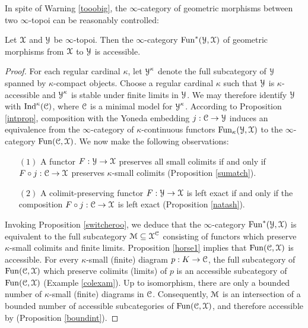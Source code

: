 In spite of Warning \ref{tooobig}, the $\infty$-category of geometric morphisms between two $\infty$-topoi can be reasonably controlled:

\begin{proposition}\label{nottoobig}
Let $\operatorname{\mathcal{X}}$ and $\operatorname{\mathcal{Y}}$ be $\infty$-topoi. Then the
$\infty$-category $\operatorname{Fun}^{\ast}(\operatorname{\mathcal{Y}}, \operatorname{\mathcal{X}})$ of geometric morphisms from
$\operatorname{\mathcal{X}}$ to $\operatorname{\mathcal{Y}}$ is accessible.
\end{proposition}

\begin{proof}
For each regular cardinal $\kappa$, let $\operatorname{\mathcal{Y}}^{\kappa}$ denote the full subcategory of
$\operatorname{\mathcal{Y}}$ spanned by $\kappa$-compact objects. Choose a regular cardinal $\kappa$ such that $\operatorname{\mathcal{Y}}$ is $\kappa$-accessible and $\operatorname{\mathcal{Y}}^{\kappa}$ is stable under finite limits in $\operatorname{\mathcal{Y}}$. We may therefore identify $\operatorname{\mathcal{Y}}$ with $\operatorname{Ind}^{\kappa}(\operatorname{\mathcal{C}})$, where
$\operatorname{\mathcal{C}}$ is a minimal model for $\operatorname{\mathcal{Y}}^{\kappa}$. According to Proposition \ref{intprop},
composition with the Yoneda embedding $j: \operatorname{\mathcal{C}} \rightarrow \operatorname{\mathcal{Y}}$ induces an equivalence
from the $\infty$-category of $\kappa$-continuous functors $\operatorname{Fun}_{\kappa}(\operatorname{\mathcal{Y}},\operatorname{\mathcal{X}})$
to the $\infty$-category $\operatorname{Fun}(\operatorname{\mathcal{C}},\operatorname{\mathcal{X}})$. We now make the following observations:

\begin{itemize}
\item[$(1)$] A functor $F: \operatorname{\mathcal{Y}} \rightarrow \operatorname{\mathcal{X}}$ preserves all small colimits if and only if
$F \circ j: \operatorname{\mathcal{C}} \rightarrow \operatorname{\mathcal{X}}$ preserves $\kappa$-small colimits (Proposition \ref{sumatch}).

\item[$(2)$] A colimit-preserving functor $F: \operatorname{\mathcal{Y}} \rightarrow \operatorname{\mathcal{X}}$ is left exact if and only if the composition $F \circ j: \operatorname{\mathcal{C}} \rightarrow \operatorname{\mathcal{X}}$ is left exact (Proposition \ref{natash}). 

\end{itemize}

Invoking Proposition \ref{switcheroo}, we deduce that the $\infty$-category $\operatorname{Fun}^{\ast}(\operatorname{\mathcal{Y}}, \operatorname{\mathcal{X}})$ is equivalent to the full subcategory $\operatorname{\mathcal{M}} \subseteq \operatorname{\mathcal{X}}^{\operatorname{\mathcal{C}}}$ consisting of functors which preserve $\kappa$-small colimits and finite limits. Proposition \ref{horse1} implies that $\operatorname{Fun}(\operatorname{\mathcal{C}},\operatorname{\mathcal{X}})$ is accessible. For every $\kappa$-small (finite) diagram $p: K \rightarrow \operatorname{\mathcal{C}}$, the full subcategory of $\operatorname{Fun}(\operatorname{\mathcal{C}},\operatorname{\mathcal{X}})$ which
preserve colimits (limits) of $p$ is an accessible subcategory of $\operatorname{Fun}(\operatorname{\mathcal{C}},\operatorname{\mathcal{X}})$
(Example \ref{colexam}). Up to isomorphism, there are only a bounded number of $\kappa$-small (finite) diagrams in $\operatorname{\mathcal{C}}$. Consequently, $\operatorname{\mathcal{M}}$ is an intersection of a bounded number of accessible subcategories of $\operatorname{Fun}(\operatorname{\mathcal{C}},\operatorname{\mathcal{X}})$, and therefore accessible by (Proposition \ref{boundint}).
\end{proof}

